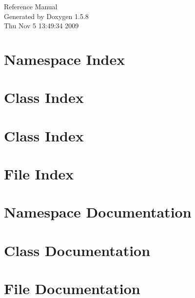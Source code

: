 \documentclass[a4paper]{book}
\begin{document}
\begin{titlepage}
\vspace*{7cm}
\begin{center}
{\Large Reference Manual}\\
\vspace*{1cm}
{\large Generated by Doxygen 1.5.8}\\
\vspace*{0.5cm}
{\small Thu Nov 5 13:49:34 2009}\\
\end{center}
\end{titlepage}
\clearemptydoublepage
{}
\tableofcontents
\clearemptydoublepage
{}
\chapter{Namespace Index}

\chapter{Class Index}

\chapter{Class Index}

\chapter{File Index}

\chapter{Namespace Documentation}

\chapter{Class Documentation}





















\chapter{File Documentation}








\printindex
\end{document}
